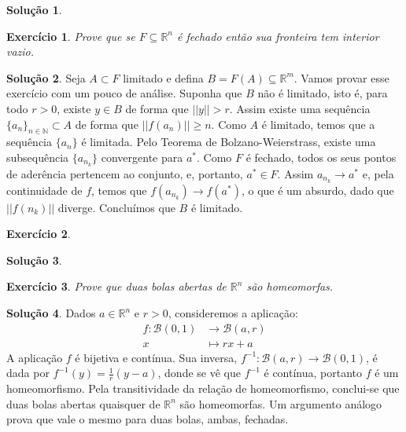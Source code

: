 \documentclass[a4paper,12pt]{article}
\newcommand{\R}{\mathbb{R}}
\newcommand{\B}{\mathcal{B}}
\theoremstyle{exer}
\newtheorem{exercise}{Exercício}
\theoremstyle{definition}
\newtheorem{solution}{Solução}
\theoremstyle{plain}
\begin{document}
\begin{solution}

\end{solution}

\begin{exercise}
    Prove que se $F \subseteq \R^n$ é fechado então sua fronteira tem interior vazio.
\end{exercise}

\begin{solution}
    Seja $A \subset F$ limitado e defina $B = F(A) \subseteq \R^m$. Vamos
    provar esse exercício com um pouco de análise. Suponha que $B$ não é
    limitado, isto é, para todo $r > 0$, existe $y \in B$ de forma que $||y||
    > r$. Assim existe uma sequência $\{a_n\}_{n \in \mathbb{N}} \subset
    A$ de forma que $||f(a_n)|| \ge n$. Como $A$ é limitado, temos que a
    sequência $\{a_n\}$ é limitada. Pelo Teorema de Bolzano-Weierstrass,
    existe uma subsequência $\{a_{n_k}\}$ convergente para $a^*$. Como $F$ é fechado, todos os seus pontos de aderência pertencem ao
    conjunto, e, portanto, $a^* \in F$. Assim $a_{n_k} \to a^*$ e, pela
    continuidade de $f$, temos que $f(a_{n_k}) \to f(a^*)$, o que é um
    absurdo, dado que $||f(n_k)||$ diverge. Concluímos que $B$ é limitado.
\end{solution}

\begin{exercise}

\end{exercise}

\begin{solution}

\end{solution}

\begin{exercise}
    Prove que duas bolas abertas de $\R^n$ são homeomorfas.
\end{exercise}

\begin{solution}
    Dados $a \in \R^n$ e $r > 0$, consideremos a aplicação:
    \begin{align*}
        f : \B(0, 1) &\to \B(a, r)\\
        x &\mapsto rx + a        
    \end{align*}
    A aplicação $f$ é bijetiva e contínua. Sua inversa, $f^{-1} : \B(a, r) \to
    \B(0, 1)$, é dada por $f^{-1}(y) = \frac{1}{r}(y - a)$, donde se vê que
    $f^{-1}$ é contínua, portanto $f$ é um homeomorfismo. Pela transitividade
    da relação de homeomorfismo, conclui-se que duas bolas abertas quaisquer de
    $\R^n$ são homeomorfas. Um argumento análogo prova que vale o mesmo para duas bolas, ambas, fechadas.
\end{solution}
\end{document}

